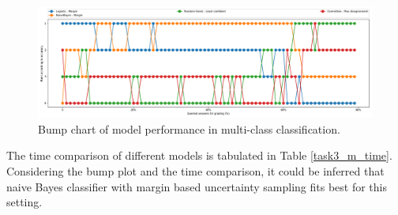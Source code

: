 \begin{figure}[h]
	\centering
	\includegraphics[scale=0.3]{images/task3_rank}
	\caption{Bump chart of model performance in multi-class classification.}
	\label{t3_m_bump}
\end{figure}



The time comparison of different models is tabulated in Table \ref{task3_m_time}. Considering the bump plot and the time comparison, it could be inferred that naive Bayes classifier with margin based uncertainty sampling fits best for this setting.

